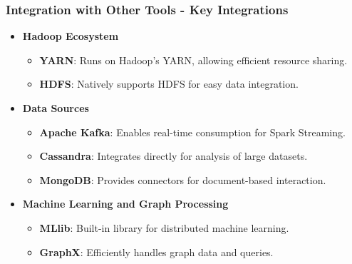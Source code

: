 \documentclass[aspectratio=169]{beamer}
\begin{document}
\begin{frame}[fragile]
    \frametitle{Integration with Other Tools - Key Integrations}
    \begin{itemize}
        \item \textbf{Hadoop Ecosystem}
            \begin{itemize}
                \item \textbf{YARN}: Runs on Hadoop's YARN, allowing efficient resource sharing.
                \item \textbf{HDFS}: Natively supports HDFS for easy data integration.
            \end{itemize}
        \item \textbf{Data Sources}
            \begin{itemize}
                \item \textbf{Apache Kafka}: Enables real-time consumption for Spark Streaming.
                \item \textbf{Cassandra}: Integrates directly for analysis of large datasets.
                \item \textbf{MongoDB}: Provides connectors for document-based interaction.
            \end{itemize}
        \item \textbf{Machine Learning and Graph Processing}
            \begin{itemize}
                \item \textbf{MLlib}: Built-in library for distributed machine learning.
                \item \textbf{GraphX}: Efficiently handles graph data and queries.
            \end{itemize}
    \end{itemize}
\end{frame}
\end{document}
